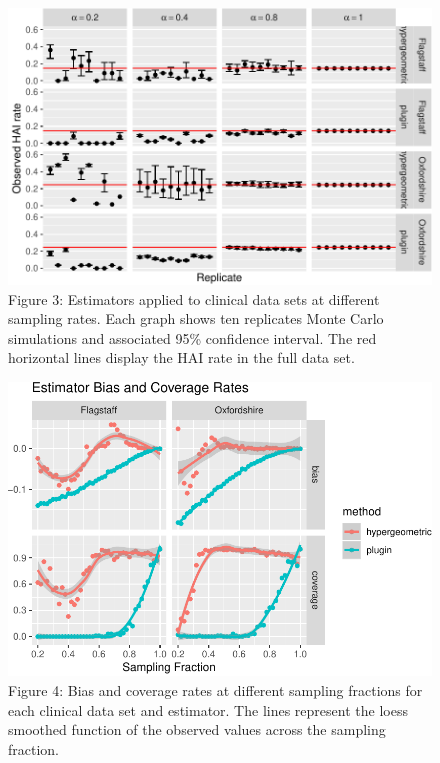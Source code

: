 \documentclass[]{article}
\begin{document}
\begin{figure}
\centering
\includegraphics{Paper_files/figure-latex/fig3-1.pdf}
\caption{\label{fig:fig3}Figure 3: Estimators applied to clinical data
sets at different sampling rates. Each graph shows ten replicates Monte
Carlo simulations and associated 95\% confidence interval. The red
horizontal lines display the HAI rate in the full data set.}
\end{figure}

\begin{figure}
\centering
\includegraphics{Paper_files/figure-latex/fig4-1.pdf}
\caption{\label{fig:fig4}Figure 4: Bias and coverage rates at different
sampling fractions for each clinical data set and estimator. The lines
represent the loess smoothed function of the observed values across the
sampling fraction.}
\end{figure}
\end{document}

